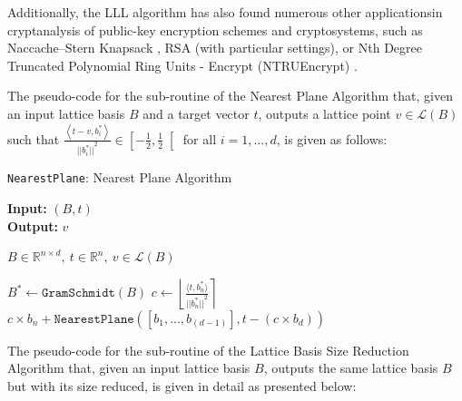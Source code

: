 \documentclass[runningheads]{llncs}
\numberwithin{equation}{section}
\begin{document}
\begin{enumerate}
        Additionally, the LLL algorithm has also found numerous other applications\break in cryptanalysis of public-key encryption schemes and cryptosystems, such as Naccache–Stern Knapsack \cite{naccache-stern:new-public-key-cryptosystem-based-higher-residues:1998:06-2024}, RSA \cite{rivest-shamir-adleman:method-digital-signatures-and-public-key-cryptosystems:1978:06-2024} (with particular settings), or Nth Degree Truncated Polynomial Ring Units - Encrypt (NTRUEncrypt) \cite{hoffstein-pipher-silverman:ntru-ring-based-public-key-cryptosystem:1998:06-2024}.        
    
        \clearpage
        
        The pseudo-code for the sub-routine of the Nearest Plane Algorithm that, given an input lattice basis $B$ and a target vector $t$, outputs a lattice point $v \in \mathcal{L}(B)$ such that $\frac{ \left\langle t -  v, {b}^{*}_{i}\right\rangle }{{|| {b}_{i}^{*} ||}^{2} } \in \left[-\frac{1}{2}, \frac{1}{2}\right[$ for all $i = 1, ..., d$, is given as follows:

        \vspace{-2ex}
        \begin{algorithm}
            \caption{\texorpdfstring{\texttt{NearestPlane}}\/: Nearest Plane Algorithm}
            \label{subrou:nearest-plane-algorithm}
            
            \textbf{Input:} $ (B, t) $\\
            \textbf{Output:} $ v $
            
            \begin{algorithmic}[1]
                \Ensure $B \in {\mathbb{R}}^{n \times d},\ t \in {\mathbb{R}}^{n},\ v \in \mathcal{L}(B)$
            
                \vspace{2ex}

                    \State {}
                \Else
                    \State ${B}^{*} \gets \texttt{GramSchmidt}(B)$
                    \State $c \gets \left\lfloor \frac{ \langle t, {b}^{*}_{n} \rangle }{ {|| {b}^{*}_{n} ||}^{2} } \right\rceil$
                    \State \Return $c \times {b}_{n} + \texttt{NearestPlane}\left([{b}_{1}, ..., {b}_{(d - 1)}], t - (c \times {b}_{d})\right)$
                \EndIf
            \end{algorithmic}
        \end{algorithm}
        
        The pseudo-code for the sub-routine of the Lattice Basis Size Reduction Algorithm that, given an input lattice basis $B$, outputs the same lattice basis $B$ but with its size reduced, is given in detail as presented below:


\end{enumerate}
\end{document}
